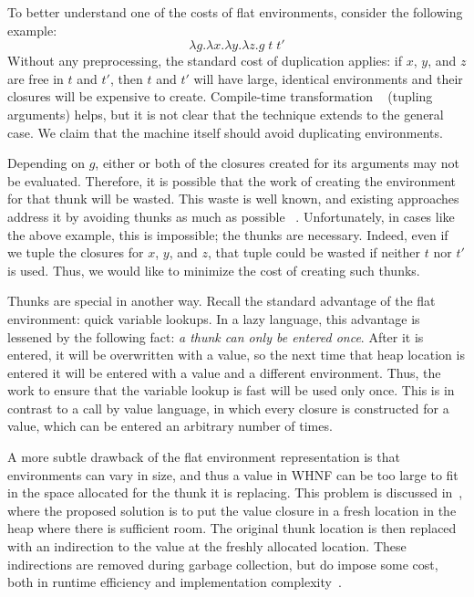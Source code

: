 To better understand one of the costs of flat environments, consider the
following example: $$\lambda g.\lambda x.\lambda y.\lambda z.g
\; t \;t'$$ Without any preprocessing, the standard cost of duplication applies:
if $x$, $y$, and $z$ are free in $t$ and $t'$, then $t$ and $t'$ will have
large, identical environments and their closures will be expensive to create.
Compile-time transformation ~\cite{peyton1992implementing} (tupling arguments)
helps, but it is not clear that the technique extends to the general case. We
claim that the machine itself should avoid duplicating environments.

Depending on $g$, either or both of the closures created for its arguments may
not be evaluated.  Therefore, it is possible that the work of creating the
environment for that thunk will be wasted. This waste is well known, and
existing approaches address it by avoiding thunks as much as possible
~\cite{jonesstg,johnsson1984efficient}. Unfortunately, in cases like the above
example, this is impossible; the thunks are necessary. Indeed, even if we tuple
the closures for $x$, $y$, and $z$, that tuple could be wasted if neither $t$ nor
$t'$ is used. Thus, we would like to minimize the cost of creating such thunks.

Thunks are special in another way.  Recall the standard advantage of the flat
environment: quick variable lookups. In a lazy language, this advantage is
lessened by the following fact: \emph{a thunk can only be entered once}. After
it is entered, it will be overwritten with a value, so the next time that heap
location is entered it will be entered with a value and a different environment.
Thus, the work to ensure that the variable lookup is fast will be used only
once. This is in contrast to a call by value language, in which every closure is
constructed for a value, which can be entered an arbitrary number of times. 

A more subtle drawback of the flat environment representation is that
environments can vary in size, and thus a value in WHNF can be too large to fit
in the space allocated for the thunk it is replacing. This problem is discussed
in~\cite{jonesstg}, where the proposed solution is to put the value closure in
a fresh location in the heap where there is sufficient room. The original
thunk location is then replaced with an indirection to the value at the freshly
allocated location. These indirections are removed during garbage collection,
but do impose some cost, both in runtime efficiency and implementation
complexity~\cite{jonesstg}.

